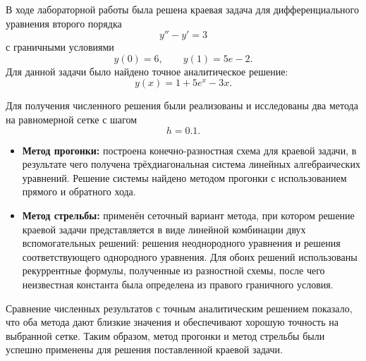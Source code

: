 В ходе лабораторной работы была решена краевая задача для дифференциального уравнения второго порядка
\[
    y'' - y' = 3
\]
с граничными условиями
\[
    y(0)=6, \qquad y(1)=5e-2.
\]
Для данной задачи было найдено точное аналитическое решение:
\[
    y(x)=1+5e^x-3x.
\]

Для получения численного решения были реализованы и исследованы два метода на равномерной сетке с шагом
\[
    h=0.1.
\]

\begin{itemize}
    \item \textbf{Метод прогонки:} построена конечно-разностная схема для краевой задачи, в результате чего получена трёхдиагональная система линейных алгебраических уравнений. Решение системы найдено методом прогонки с использованием прямого и обратного хода.

    \item \textbf{Метод стрельбы:} применён сеточный вариант метода, при котором решение краевой задачи представляется в виде линейной комбинации двух вспомогательных решений: решения неоднородного уравнения и решения соответствующего однородного уравнения. Для обоих решений использованы рекуррентные формулы, полученные из разностной схемы, после чего неизвестная константа была определена из правого граничного условия.
\end{itemize}

Сравнение численных результатов с точным аналитическим решением показало, что оба метода дают близкие значения и обеспечивают хорошую точность на выбранной сетке. Таким образом, метод прогонки и метод стрельбы были успешно применены для решения поставленной краевой задачи.